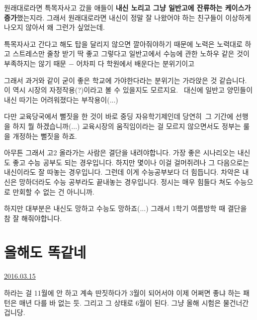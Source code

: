 \vspace{5mm}

원래대로라면 특목자사고 갔을 애들이 \textbf{내신 노리고 그냥 일반고에 잔류하는 케이스가 증가}했는지라.
그래서 원래대로라면 내신이 정말 잘 나왔어야 하는 친구들이 이상하게 나오지 않아서 왜 그런가 싶었는데.
\vspace{5mm}

특목자사고 간다고 해도 탑을 달리지 않으면 깔아줘야하기 때문에 노력은 노력대로 하고 스트레스만 줄창 받기 딱 좋고
그렇다고 일반고에서 수능에 관한 노하우 같은 것이 부족하지는 않기 때문 $-$ 어차피 다 학원에서 배운다는 분위기이고
\vspace{5mm}

그래서 과거와 같이 굳이 좋은 학교에 가야한다라는 분위기는 가라앉은 것 같습니다.
이 역시 시장의 자정작용(?)이라고 볼 수 있을지도 모르지요.  대신에 일반고 양민들이 내신 따기는 어려워졌다는 부작용이(...)
\vspace{5mm}

다만 교육당국에서 뻘짓을 한 것이 바로 중딩 자유학기제인데 당연히 그 기간에 선행을 하지 뭘 하겠습니까(...)
교육시장의 움직임이라는 걸 모르지 않으면서도 정부는 룰을 개정하는 뻘짓을 하죠.
\vspace{5mm}

아무튼 그래서 고2 올라가는 사람은 결단을 내려야합니다.
가장 좋은 시나리오는 내신도 좋고 수능 공부도 되는 경우입니다. 하지만 몇이나 이걸 걸머쥐려나
그 다음으로는 내신이라도 잘 따놓는 경우입니다. 그런데 이게 수능공부보다 더 힘듭니다.
차악은 내신은 망하더라도 수능 공부라도 끝내놓는 경우입니다. 정시는 매우 힘들다 쳐도 수능으로 만회할 수 없는 건 아니니까.
\vspace{5mm}

하지만 대부분은 내신도 망하고 수능도 망하죠(...)
그래서 1학기 여름방학 때 결단을 참 잘 해줘야합니다.
\vspace{5mm}






\section{올해도 똑같네}
\href{https://www.kockoc.com/Apoc/677337}{2016.03.15}

\vspace{5mm}

하라는 걸 11월에 안 하고 계속 딴짓하다가 3월이 되어서야 이제 어쩌면 좋냐 하는 패턴은 매년 다를 바 없는 듯.
그리고 그 상태로 6월이 된다. 그냥 올해 시험은 물건너간 겁니당.
\vspace{5mm}


